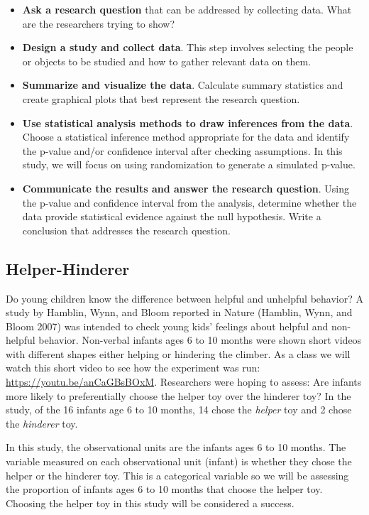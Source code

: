 \documentclass[
]{report}
\begin{document}
\begin{itemize}
\item
  \textbf{Ask a research question} that can be addressed by collecting data. What are the researchers trying to show?
\item
  \textbf{Design a study and collect data}. This step involves selecting the people or objects to be studied and how to gather relevant data on them.
\item
  \textbf{Summarize and visualize the data}. Calculate summary statistics and create graphical plots that best represent the research question.
\item
  \textbf{Use statistical analysis methods to draw inferences from the data}. Choose a statistical inference method appropriate for the data and identify the p-value and/or confidence interval after checking assumptions. In this study, we will focus on using randomization to generate a simulated p-value.
\item
  \textbf{Communicate the results and answer the research question}. Using the p-value and confidence interval from the analysis, determine whether the data provide statistical evidence against the null hypothesis. Write a conclusion that addresses the research question.
\end{itemize}

\newpage

\hypertarget{helper-hinderer}{%
\subsection{Helper-Hinderer}\label{helper-hinderer}}

Do young children know the difference between helpful and unhelpful behavior? A study by Hamblin, Wynn, and Bloom reported in Nature (Hamblin, Wynn, and Bloom 2007) was intended to check young kids' feelings about helpful and non-helpful behavior. Non-verbal infants ages 6 to 10 months were shown short videos with different shapes either helping or hindering the climber. As a class we will watch this short video to see how the experiment was run: \url{https://youtu.be/anCaGBsBOxM}. Researchers were hoping to assess: Are infants more likely to preferentially choose the helper toy over the hinderer toy? In the study, of the 16 infants age 6 to 10 months, 14 chose the \emph{helper} toy and 2 chose the \emph{hinderer} toy.

In this study, the observational units are the infants ages 6 to 10 months. The variable measured on each observational unit (infant) is whether they chose the helper or the hinderer toy. This is a categorical variable so we will be assessing the proportion of infants ages 6 to 10 months that choose the helper toy. Choosing the helper toy in this study will be considered a success.
\end{document}
